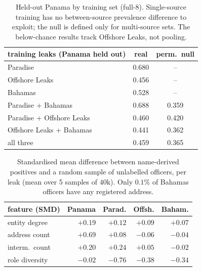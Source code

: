 \documentclass[11pt]{article}
\begin{document}
\begin{table}[t]\centering\small\setlength{\tabcolsep}{4pt}
\begin{tabular}{lcc}
\toprule
training leaks (Panama held out) & real & perm.\ null\\
\midrule
Paradise & 0.680 & --\\
Offshore Leaks & 0.456 & --\\
Bahamas & 0.528 & --\\
Paradise + Bahamas & 0.688 & 0.359\\
Paradise + Offshore Leaks & 0.460 & 0.420\\
Offshore Leaks + Bahamas & 0.441 & 0.362\\
all three & 0.459 & 0.365\\
\bottomrule
\end{tabular}
\caption{Held-out Panama by training set (full-8). Single-source training has no
between-source prevalence difference to exploit; the null is defined only for
multi-source sets. The below-chance results track Offshore Leaks, not
pooling.}\label{tab:subsets}\end{table}

\begin{table}[t]\centering\small\setlength{\tabcolsep}{4.5pt}
\begin{tabular}{lrrrr}
\toprule
feature (SMD) & Panama & Parad. & Offsh. & Baham.\\
\midrule
entity degree & $+0.19$ & $+0.12$ & $+0.09$ & $+0.07$\\
address count & $+0.69$ & $+0.08$ & $-0.06$ & $-0.04$\\
interm.\ count & $+0.20$ & $+0.24$ & $+0.05$ & $-0.02$\\
role diversity & $-0.02$ & $-0.76$ & $-0.38$ & $-0.34$\\
\bottomrule
\end{tabular}
\caption{Standardised mean difference between name-derived positives and a random
sample of unlabelled officers, per leak (mean over 5 samples of $40$k). Only $0.1\%$
of Bahamas officers have any registered address.}\label{tab:smd}\end{table}
\end{document}

